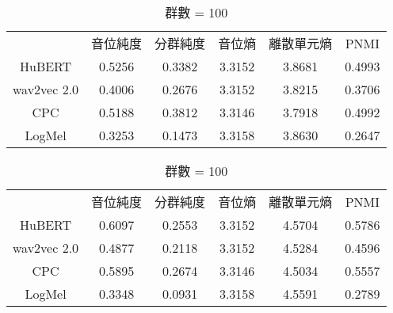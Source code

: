 \begin{table}[!htbp]
    \centering
    \begin{subtable}[t]{\textwidth}
        \centering
        \begin{tabular}{cccccc}
            & 音位純度 & 分群純度 & 音位熵 & 離散單元熵 & PNMI \\
            HuBERT      &   0.5256   &  0.3382 &   3.3152  &  3.8681    &     0.4993   \\   %
            wav2vec 2.0 &   0.4006   &  0.2676 &   3.3152  &  3.8215    &     0.3706   \\   %
            CPC         &   0.5188   &  0.3812 &   3.3146  &  3.7918    &     0.4992   \\   %
            LogMel      &   0.3253   &  0.1473 &   3.3158  &  3.8630    &     0.2647   \\   %
        \end{tabular}
        \caption{群數 = 50}
        \label{tab:ch3-clu050}
    \end{subtable}

    \vspace{0.5cm}

    \begin{subtable}[t]{\textwidth}
        \centering
        \begin{tabular}{cccccc}
            & 音位純度 & 分群純度 & 音位熵 & 離散單元熵 & PNMI \\
            HuBERT      &   0.6097   &  0.2553 &   3.3152  &  4.5704    &     0.5786   \\   %
            wav2vec 2.0 &   0.4877   &  0.2118 &   3.3152  &  4.5284    &     0.4596   \\   %
            CPC         &   0.5895   &  0.2674 &   3.3146  &  4.5034    &     0.5557   \\   %
            LogMel      &   0.3348   &  0.0931 &   3.3158  &  4.5591    &     0.2789   \\   %
        \end{tabular}
        \caption{群數 = 100}
        \label{tab:ch3-clu100}
    \end{subtable}

    \vspace{0.5cm}


\end{table}
